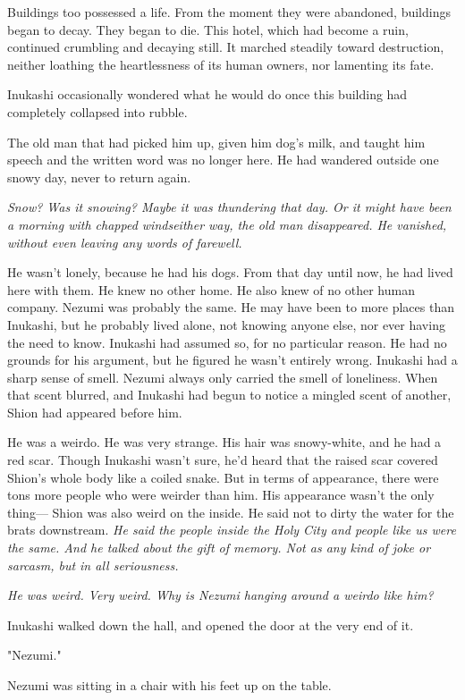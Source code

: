 Buildings too possessed a life. From the moment they were abandoned,
buildings began to decay. They began to die. This hotel, which had
become a ruin, continued crumbling and decaying still. It marched
steadily toward destruction, neither loathing the heartlessness of its
human owners, nor lamenting its fate.

Inukashi occasionally wondered what he would do once this building had
completely collapsed into rubble.

The old man that had picked him up, given him dog's milk, and taught him
speech and the written word was no longer here. He had wandered outside
one snowy day, never to return again.

\emph{Snow? Was it snowing? Maybe it was thundering that day. Or it might have
been a morning with chapped winds\el either way, the old man
disappeared. He vanished, without even leaving any words of farewell.}

He wasn't lonely, because he had his dogs. From that day until now, he
had lived here with them. He knew no other home. He also knew of no
other human company. Nezumi was probably the same. He may have been to
more places than Inukashi, but he probably lived alone, not knowing
anyone else, nor ever having the need to know. Inukashi had assumed so,
for no particular reason. He had no grounds for his argument, but he
figured he wasn't entirely wrong. Inukashi had a sharp sense of smell.
Nezumi always only carried the smell of loneliness. When that scent
blurred, and Inukashi had begun to notice a mingled scent of another,
Shion had appeared before him.

He was a weirdo. He was very strange. His hair was snowy-white, and he
had a red scar. Though Inukashi wasn't sure, he'd heard that the raised
scar covered Shion's whole body like a coiled snake. But in terms of
appearance, there were tons more people who were weirder than him. His
appearance wasn't the only thing--- Shion was also weird on the inside. He
said not to dirty the water for the brats downstream. \emph{He said the people
inside the Holy City and people like us were the same. And he talked
about the gift of memory. Not as any kind of joke or sarcasm, but in all
seriousness.}

\emph{He was weird. Very weird. Why is Nezumi hanging around a weirdo like
him?}

Inukashi walked down the hall, and opened the door at the very end of
it.

"Nezumi."

Nezumi was sitting in a chair with his feet up on the table.

